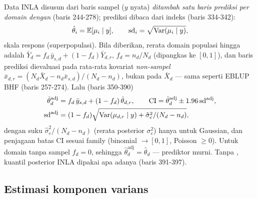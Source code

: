 Data INLA disusun dari baris sampel ($y$ nyata) \emph{ditambah satu baris
prediksi per domain dengan}  (baris 244-278); prediksi dibaca dari
indeks  (baris 334-342):
\begin{equation}
  \hat\theta_i=\mathbb E[\mu_i\mid y],\qquad
  \mathrm{sd}_i=\sqrt{\operatorname{Var}(\mu_i\mid y)},
  \label{eq:hbunit-pred}
\end{equation}
skala respons (superpopulasi). Bila  diberikan, rerata
domain populasi hingga adalah
$\bar Y_d=f_d\,\bar y_{s,d}+(1-f_d)\bar Y_{d,r}$, $f_d=n_d/N_d$ (dipangkas ke
$[0,1]$), dan baris prediksi dievaluasi pada rata-rata kovariat
\emph{non-sampel} $\bar x_{d,r}=(N_d\bar X_d-n_d\bar x_{s,d})/(N_d-n_d)$,
bukan pada $\bar X_d$ --- sama seperti EBLUP BHF (baris 257-274). Lalu
(baris 350-390)
\begin{equation}
\begin{aligned}
  \hat\theta_d^{\text{adj}}&=f_d\,\bar y_{s,d}+(1-f_d)\,\hat\theta_{d,r},
  \qquad
  \mathrm{CI}=\hat\theta_d^{\text{adj}}\pm1.96\,\mathrm{sd}^{\text{adj}},\\
  \mathrm{sd}^{\text{adj}}&=(1-f_d)\sqrt{\operatorname{Var}(\mu_{d,r}\mid y)+\hat\sigma_e^2/(N_d-n_d)},
\end{aligned}
  \label{eq:hbunit-fpc}
\end{equation}
dengan suku $\hat\sigma_e^2/(N_d-n_d)$ (rerata posterior $\sigma_e^2$) hanya
untuk Gaussian, dan penjagaan batas CI sesuai family (binomial $\to[0,1]$,
Poisson $\ge0$). Untuk domain tanpa sampel $f_d=0$, sehingga
$\hat\theta_d^{\text{adj}}=\hat\theta_d$ --- prediktor murni. Tanpa
, kuantil posterior INLA dipakai apa adanya (baris
391-397).


\subsection{Estimasi komponen varians}\label{sec:hbunit-varians}


